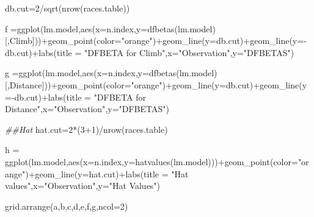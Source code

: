 \documentclass[
  letterpaper,
  DIV=11,
  numbers=noendperiod]{scrreprt}
\newenvironment{Shaded}{\begin{snugshade}}{\end{snugshade}}
\newcommand{\AttributeTok}[1]{\textcolor[rgb]{0.40,0.45,0.13}{#1}}
\newcommand{\DecValTok}[1]{\textcolor[rgb]{0.68,0.00,0.00}{#1}}
\newcommand{\DocumentationTok}[1]{\textcolor[rgb]{0.37,0.37,0.37}{\textit{#1}}}
\newcommand{\FunctionTok}[1]{\textcolor[rgb]{0.28,0.35,0.67}{#1}}
\newcommand{\NormalTok}[1]{\textcolor[rgb]{0.00,0.23,0.31}{#1}}
\newcommand{\OtherTok}[1]{\textcolor[rgb]{0.00,0.23,0.31}{#1}}
\newcommand{\SpecialCharTok}[1]{\textcolor[rgb]{0.37,0.37,0.37}{#1}}
\newcommand{\StringTok}[1]{\textcolor[rgb]{0.13,0.47,0.30}{#1}}
\begin{document}
\begin{Shaded}
\begin{Highlighting}[]
\NormalTok{db.cut}\OtherTok{=}\DecValTok{2}\SpecialCharTok{/}\FunctionTok{sqrt}\NormalTok{(}\FunctionTok{nrow}\NormalTok{(races.table))}


\NormalTok{f }\OtherTok{=}\FunctionTok{ggplot}\NormalTok{(lm.model,}\FunctionTok{aes}\NormalTok{(}\AttributeTok{x=}\NormalTok{n.index,}\AttributeTok{y=}\FunctionTok{dfbetas}\NormalTok{(lm.model)[,}\StringTok{\textquotesingle{}Climb\textquotesingle{}}\NormalTok{]))}\SpecialCharTok{+}\FunctionTok{geom\_point}\NormalTok{(}\AttributeTok{color=}\StringTok{"orange"}\NormalTok{)}\SpecialCharTok{+}\FunctionTok{geom\_line}\NormalTok{(}\AttributeTok{y=}\NormalTok{db.cut)}\SpecialCharTok{+}\FunctionTok{geom\_line}\NormalTok{(}\AttributeTok{y=}\SpecialCharTok{{-}}\NormalTok{db.cut)}\SpecialCharTok{+}\FunctionTok{labs}\NormalTok{(}\AttributeTok{title =} \StringTok{"DFBETA for Climb"}\NormalTok{,}\AttributeTok{x=}\StringTok{"Observation"}\NormalTok{,}\AttributeTok{y=}\StringTok{"DFBETAS"}\NormalTok{)}

\NormalTok{g }\OtherTok{=}\FunctionTok{ggplot}\NormalTok{(lm.model,}\FunctionTok{aes}\NormalTok{(}\AttributeTok{x=}\NormalTok{n.index,}\AttributeTok{y=}\FunctionTok{dfbetas}\NormalTok{(lm.model)[,}\StringTok{\textquotesingle{}Distance\textquotesingle{}}\NormalTok{]))}\SpecialCharTok{+}\FunctionTok{geom\_point}\NormalTok{(}\AttributeTok{color=}\StringTok{"orange"}\NormalTok{)}\SpecialCharTok{+}\FunctionTok{geom\_line}\NormalTok{(}\AttributeTok{y=}\NormalTok{db.cut)}\SpecialCharTok{+}\FunctionTok{geom\_line}\NormalTok{(}\AttributeTok{y=}\SpecialCharTok{{-}}\NormalTok{db.cut)}\SpecialCharTok{+}\FunctionTok{labs}\NormalTok{(}\AttributeTok{title =} \StringTok{"DFBETA for Distance"}\NormalTok{,}\AttributeTok{x=}\StringTok{"Observation"}\NormalTok{,}\AttributeTok{y=}\StringTok{"DFBETAS"}\NormalTok{)}

\DocumentationTok{\#\#Hat}
\NormalTok{hat.cut}\OtherTok{=}\DecValTok{2}\SpecialCharTok{*}\NormalTok{(}\DecValTok{3}\SpecialCharTok{+}\DecValTok{1}\NormalTok{)}\SpecialCharTok{/}\FunctionTok{nrow}\NormalTok{(races.table)}

\NormalTok{h }\OtherTok{=} \FunctionTok{ggplot}\NormalTok{(lm.model,}\FunctionTok{aes}\NormalTok{(}\AttributeTok{x=}\NormalTok{n.index,}\AttributeTok{y=}\FunctionTok{hatvalues}\NormalTok{(lm.model)))}\SpecialCharTok{+}\FunctionTok{geom\_point}\NormalTok{(}\AttributeTok{color=}\StringTok{"orange"}\NormalTok{)}\SpecialCharTok{+}\FunctionTok{geom\_line}\NormalTok{(}\AttributeTok{y=}\NormalTok{hat.cut)}\SpecialCharTok{+}\FunctionTok{labs}\NormalTok{(}\AttributeTok{title =} \StringTok{"Hat values"}\NormalTok{,}\AttributeTok{x=}\StringTok{"Observation"}\NormalTok{,}\AttributeTok{y=}\StringTok{"Hat Values"}\NormalTok{)}

\FunctionTok{grid.arrange}\NormalTok{(a,b,c,d,e,f,g,}\AttributeTok{ncol=}\DecValTok{2}\NormalTok{)}
\end{Highlighting}
\end{Shaded}
\end{document}
